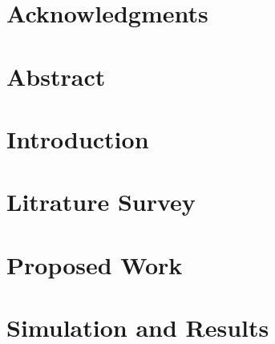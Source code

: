 \documentclass[11pt]{book}
\renewcommand{\baselinestretch}{1.2}
\begin{document}

 

 


\newpage
 \thispagestyle{empty}
\renewcommand{\thesisdedication}{{\large Copyright \copyright~~ The LNMIIT 2017\\}{\large All Rights Reserved\\}}
\thesisdedicationpage



\newpage
\thispagestyle{empty}
\renewcommand{\thesisdedication}{\large Dedicated to our amazing Faculty and supportive Seniors and Peers }
\thesisdedicationpage


\chapter*{Acknowledgments}
\label{ch:ack}


\chapter*{Abstract}
\label{ch:ack}



\tableofcontents

\chapter{Introduction}
\label{ch:intro}


\chapter{Litrature Survey}
\label{ch:reversible}


\chapter{Proposed Work}
\label{ch:new}


\chapter{Simulation and Results}
\label{ch:result}

\end{document}
